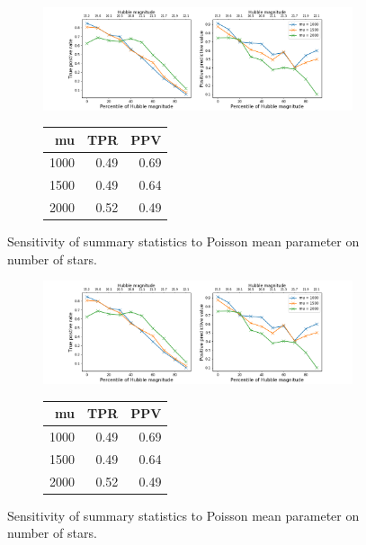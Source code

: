 
\begin{figure}[ht]
\begin{subfigure}{\textwidth}
\centering
\includegraphics[width = \textwidth]{figures/prior_mu_sensitivty.png}
\end{subfigure}
\begin{subfigure}{\textwidth}
\begin{center}
\begin{tabular}{rrr}
\toprule
     mu &   TPR &   PPV \\
\midrule
 1000&  0.49 &  0.69 \\
 1500&  0.49 &  0.64 \\
 2000 &  0.52 &  0.49 \\
\bottomrule
\end{tabular}
\par\vspace{0pt}
\end{center}
\end{subfigure}\hfill
\caption{Sensitivity of summary statistics to Poisson mean parameter on number of stars. }
\end{figure}

\begin{figure}[ht]
\begin{subfigure}{\textwidth}
\centering
\includegraphics[width = \textwidth]{figures/prior_mu_sensitivty.png}
\end{subfigure}
\begin{subfigure}{\textwidth}
\begin{center}
\begin{tabular}{rrr}
\toprule
     mu &   TPR &   PPV \\
\midrule
 1000&  0.49 &  0.69 \\
 1500&  0.49 &  0.64 \\
 2000 &  0.52 &  0.49 \\
\bottomrule
\end{tabular}
\par\vspace{0pt}
\end{center}
\end{subfigure}\hfill
\caption{Sensitivity of summary statistics to Poisson mean parameter on number of stars. }
\end{figure}
